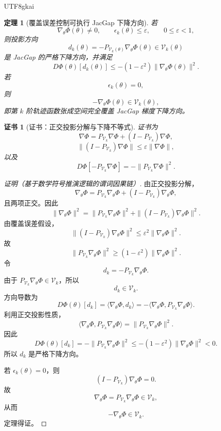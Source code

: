 \documentclass[12pt]{article}
\newtheorem{theorem}{定理}[section]
\newtheorem{Certificate}{证书}[section]
\begin{document}
\begin{CJK*}{UTF8}{gkai}
\begin{theorem}[覆盖误差控制可执行 JacGap 下降方向]
\label{thm:tex57-jacgap-cover-descent}
若
\[
  \nabla_\theta\Phi(\theta)\neq0,
  \qquad
  \epsilon_k(\theta)\le\varepsilon,
  \qquad
  0\le\varepsilon<1,
\]
则投影方向
\[
  d_k(\theta)
  =
  -P_{\mathcal V_k(\theta)}
  \nabla_\theta\Phi(\theta)
  \in
  \mathcal V_k(\theta)
\]
是 JacGap 的严格下降方向，并满足
\[
  D\Phi(\theta)[d_k(\theta)]
  \le
  -(1-\varepsilon^2)
  \|\nabla_\theta\Phi(\theta)\|^2.
\]
若
\[
  \epsilon_k(\theta)=0,
\]
则
\[
  -\nabla_\theta\Phi(\theta)\in\mathcal V_k(\theta),
\]
即第 \(k\) 阶轨迹函数张成空间完全覆盖 JacGap 梯度下降方向。
\end{theorem}

\begin{Certificate}[证书：正交投影分解与下降不等式]
\label{cert:tex57-jacgap-cover-descent}
证书为
\[
  \nabla\Phi
  =
  P_{\mathcal V_k}\nabla\Phi
  +
  (I-P_{\mathcal V_k})\nabla\Phi,
\]
\[
  \|(I-P_{\mathcal V_k})\nabla\Phi\|
  \le
  \varepsilon\|\nabla\Phi\|,
\]
以及
\[
  D\Phi[-P_{\mathcal V_k}\nabla\Phi]
  =
  -\|P_{\mathcal V_k}\nabla\Phi\|^2.
\]
\end{Certificate}

\begin{proof}[证明（基于数学符号推演逻辑的谓词因果链）]
由正交投影分解，
\[
  \nabla_\theta\Phi
  =
  P_{\mathcal V_k}\nabla_\theta\Phi
  +
  (I-P_{\mathcal V_k})\nabla_\theta\Phi,
\]
且两项正交。因此
\[
  \|\nabla_\theta\Phi\|^2
  =
  \|P_{\mathcal V_k}\nabla_\theta\Phi\|^2
  +
  \|(I-P_{\mathcal V_k})\nabla_\theta\Phi\|^2.
\]
由覆盖误差假设，
\[
  \|(I-P_{\mathcal V_k})\nabla_\theta\Phi\|^2
  \le
  \varepsilon^2\|\nabla_\theta\Phi\|^2.
\]
故
\[
  \|P_{\mathcal V_k}\nabla_\theta\Phi\|^2
  \ge
  (1-\varepsilon^2)\|\nabla_\theta\Phi\|^2.
\]
令
\[
  d_k=-P_{\mathcal V_k}\nabla_\theta\Phi.
\]
由于 \(P_{\mathcal V_k}\nabla_\theta\Phi\in\mathcal V_k\)，所以
\[
  d_k\in\mathcal V_k.
\]
方向导数为
\[
  D\Phi(\theta)[d_k]
  =
  \langle\nabla_\theta\Phi,d_k\rangle
  =
  -\langle\nabla_\theta\Phi,P_{\mathcal V_k}\nabla_\theta\Phi\rangle.
\]
利用正交投影性质，
\[
  \langle\nabla_\theta\Phi,P_{\mathcal V_k}\nabla_\theta\Phi\rangle
  =
  \|P_{\mathcal V_k}\nabla_\theta\Phi\|^2.
\]
因此
\[
  D\Phi(\theta)[d_k]
  =
  -\|P_{\mathcal V_k}\nabla_\theta\Phi\|^2
  \le
  -(1-\varepsilon^2)\|\nabla_\theta\Phi\|^2<0.
\]
所以 \(d_k\) 是严格下降方向。

若 \(\epsilon_k(\theta)=0\)，则
\[
  (I-P_{\mathcal V_k})\nabla_\theta\Phi=0.
\]
故
\[
  \nabla_\theta\Phi=P_{\mathcal V_k}\nabla_\theta\Phi\in\mathcal V_k,
\]
从而
\[
  -\nabla_\theta\Phi\in\mathcal V_k.
\]
定理得证。
\end{proof}


\end{CJK*}
\end{document}
